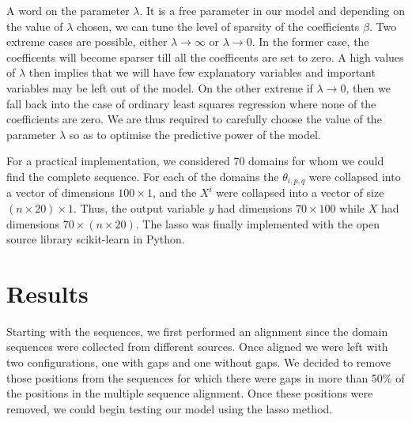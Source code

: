 \documentclass[a4paper, 12pt]{article}
\begin{document}
A word on the parameter $\lambda$. It is a free parameter in our model and depending on the value of $\lambda$ chosen, we can tune the level of sparsity of the coefficients $\beta$. Two extreme cases are possible, either $\lambda \rightarrow \infty$ or $\lambda \rightarrow 0$. In the former case, the coefficents will become sparser till all the coefficents are set to zero. A high values of $\lambda$ then implies that we will have few explanatory variables and important variables may be left out of the model. On the other extreme if $\lambda \rightarrow 0$, then we fall back into the case of ordinary least squares regression where none of the coefficients are zero. We are thus required to carefully choose the value of the parameter $\lambda$ so as to optimise the predictive power of the model. 

For a practical implementation, we considered 70 domains for whom we could find the complete sequence. For each of the domains the $\theta_{i,p,q}$ were collapsed into a vector of dimensions $100 \times 1$, and the $X^{i}$ were collapsed into a vector of size $ (n \times 20) \times 1$. Thus, the output variable $y$ had dimensions $70 \times 100$ while $X$ had dimensions $70 \times (n\times 20)$. The lasso was finally implemented with the open source library scikit-learn in Python. 

\section{Results}

Starting with the sequences, we first performed an alignment since the domain sequences were collected from different sources. Once aligned we were left with two configurations, one with gaps and one without gaps. We decided to remove those positions from the sequences for which there were gaps in more than 50\% of the positions in the multiple sequence alignment. Once these positions were removed, we could begin testing our model using the lasso method. 
\end{document}
